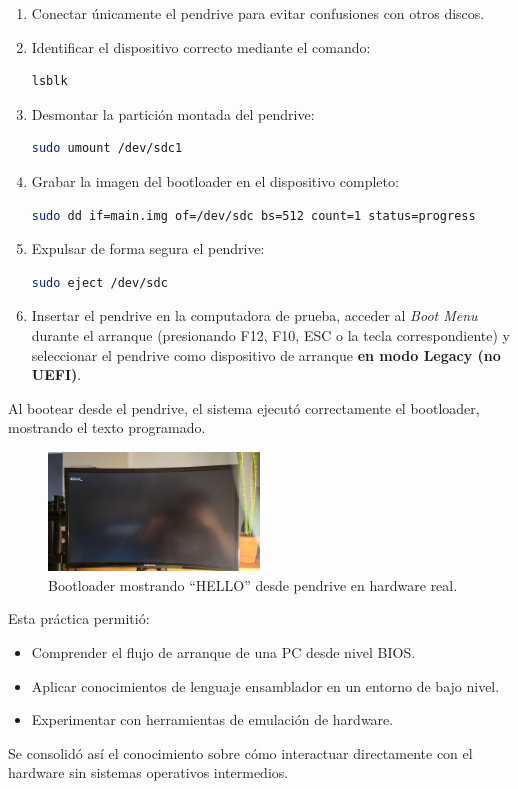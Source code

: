 \begin{enumerate}
    \item Conectar únicamente el pendrive para evitar confusiones con otros discos.
    \item Identificar el dispositivo correcto mediante el comando:
    \begin{lstlisting}[language=bash]
lsblk
    \end{lstlisting}
    \item Desmontar la partición montada del pendrive:
    \begin{lstlisting}[language=bash]
sudo umount /dev/sdc1
    \end{lstlisting}
    \item Grabar la imagen del bootloader en el dispositivo completo:
    \begin{lstlisting}[language=bash]
sudo dd if=main.img of=/dev/sdc bs=512 count=1 status=progress
    \end{lstlisting}
    \item Expulsar de forma segura el pendrive:
    \begin{lstlisting}[language=bash]
sudo eject /dev/sdc
    \end{lstlisting}
    \item Insertar el pendrive en la computadora de prueba, acceder al \textit{Boot Menu} durante el arranque (presionando F12, F10, ESC o la tecla correspondiente) y seleccionar el pendrive como dispositivo de arranque \textbf{en modo Legacy (no UEFI)}.
\end{enumerate}

Al bootear desde el pendrive, el sistema ejecutó correctamente el bootloader, mostrando el texto programado.

\begin{figure}[H]
    \centering
    \includegraphics[width=0.5\textwidth]{images/bootloader_pendrive.jpeg}
    \caption{Bootloader mostrando ``HELLO'' desde pendrive en hardware real.}
\end{figure}

Esta práctica permitió:
\begin{itemize}
    \item Comprender el flujo de arranque de una PC desde nivel BIOS.
    \item Aplicar conocimientos de lenguaje ensamblador en un entorno de bajo nivel.
    \item Experimentar con herramientas de emulación de hardware.
\end{itemize}

Se consolidó así el conocimiento sobre cómo interactuar directamente con el hardware sin sistemas operativos intermedios.

